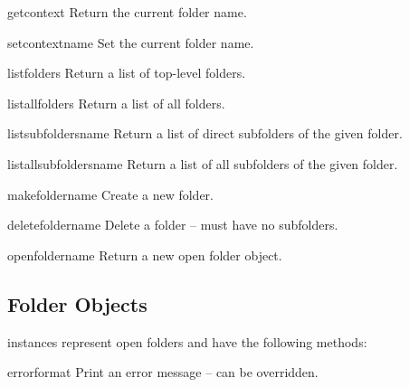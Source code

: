 \begin{methoddesc}[MH]{getcontext}{}
Return the current folder name.
\end{methoddesc}

\begin{methoddesc}[MH]{setcontext}{name}
Set the current folder name.
\end{methoddesc}

\begin{methoddesc}[MH]{listfolders}{}
Return a list of top-level folders.
\end{methoddesc}

\begin{methoddesc}[MH]{listallfolders}{}
Return a list of all folders.
\end{methoddesc}

\begin{methoddesc}[MH]{listsubfolders}{name}
Return a list of direct subfolders of the given folder.
\end{methoddesc}

\begin{methoddesc}[MH]{listallsubfolders}{name}
Return a list of all subfolders of the given folder.
\end{methoddesc}

\begin{methoddesc}[MH]{makefolder}{name}
Create a new folder.
\end{methoddesc}

\begin{methoddesc}[MH]{deletefolder}{name}
Delete a folder -- must have no subfolders.
\end{methoddesc}

\begin{methoddesc}[MH]{openfolder}{name}
Return a new open folder object.
\end{methoddesc}



\subsection{Folder Objects \label{mh-folder-objects}}

 instances represent open folders and have the following
methods:


\begin{methoddesc}[Folder]{error}{format}
Print an error message -- can be overridden.
\end{methoddesc}


